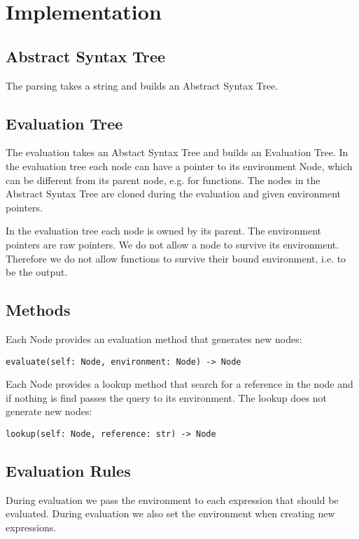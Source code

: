 \documentclass[a4paper,12pt]{article}
\begin{document}
\section{Implementation}

\subsection{Abstract Syntax Tree}
The parsing takes a string and builds an Abstract Syntax Tree.

\subsection{Evaluation Tree}

The evaluation takes an Abstact Syntax Tree and builds an Evaluation Tree. In the evaluation tree each node can have a pointer to its environment Node, which can be different from its parent node, e.g. for functions. The nodes in the Abstract Syntax Tree are cloned during the evaluation and given environment pointers.

In the evaluation tree each node is owned by its parent. The environment pointers are raw pointers. We do not allow a node to survive its environment. Therefore we do not allow functions to survive their bound environment, i.e. to be the output.

\subsection{Methods}

Each Node provides an evaluation method that generates new nodes:
\begin{verbatim}
evaluate(self: Node, environment: Node) -> Node
\end{verbatim}
Each Node provides a lookup method that search for a reference in the node and if nothing is find passes the query to its environment. The lookup does not generate new nodes:
\begin{verbatim}
lookup(self: Node, reference: str) -> Node
\end{verbatim}

\subsection{Evaluation Rules}
During evaluation we pass the environment to each expression that should be evaluated. During evaluation we also set the environment when creating new expressions.
\end{document}
